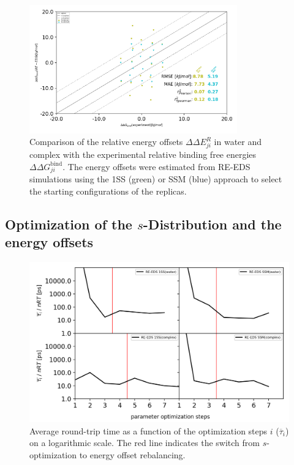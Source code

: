 
\begin{figure}[H]
\centering
  \includegraphics[width=0.8\textwidth]{fig/results/ringOpening/paramOptimization/RingClosure_system_Eoff_final_results.png}
\caption{Comparison of the relative energy offsets $\Delta \Delta E^R_{ji}$ in water and complex with the experimental relative binding free energies $\Delta \Delta G^\text{bind}_{ji}$. The energy offsets were estimated from RE-EDS simulations using the 1SS (green) or SSM (blue) approach to select the starting configurations of the replicas.} \label{SIfig:Eoff_experiment_corr_RingOpening}
\end{figure}


\subsection{Optimization of the $s$-Distribution and the energy offsets}
\begin{figure}[h]
\centering
\includegraphics[width=\linewidth]{fig/results/ringOpening/paramOptimization/RingOpening_optimization_RTstat.png}
\caption{Average round-trip time as a function of the optimization steps $i$ ($\overline{\tau}_i$) on a logarithmic scale. The red line indicates the switch from $s$-optimization to energy offset rebalancing.}
\label{SIfig:CHK1_RingOpening_soptimization_efficiency}
\end{figure}

